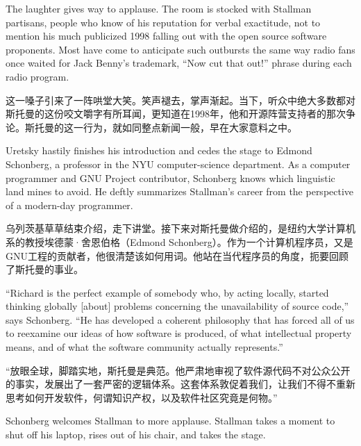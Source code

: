 \ifdefined\eng
The laughter gives way to applause. The room is stocked with Stallman partisans, people who know of his reputation for verbal exactitude, not to mention his much publicized 1998 falling out with the open source software proponents. Most have come to anticipate such outbursts the same way radio fans once waited for Jack Benny's trademark, ``Now cut that out!'' phrase during each radio program.
\fi

\ifdefined\chs
这一嗓子引来了一阵哄堂大笑。笑声褪去，掌声渐起。当下，听众中绝大多数都对斯托曼的这份咬文嚼字有所耳闻，更知道在1998年，他和开源阵营支持者的那次争论。斯托曼的这一行为，就如同整点新闻一般，早在大家意料之中。
\fi

\ifdefined\eng
Uretsky hastily finishes his introduction and cedes the stage to Edmond Schonberg, a professor in the NYU computer-science department. As a computer programmer and GNU Project contributor, Schonberg knows which linguistic land mines to avoid. He deftly summarizes Stallman's career from the perspective of a modern-day programmer.
\fi

\ifdefined\chs
乌列茨基草草结束介绍，走下讲堂。接下来对斯托曼做介绍的，是纽约大学计算机系的教授埃德蒙·舍恩伯格（Edmond Schonberg）。作为一个计算机程序员，又是GNU工程的贡献者，他很清楚该如何用词。他站在当代程序员的角度，扼要回顾了斯托曼的事业。
\fi

\ifdefined\eng
``Richard is the perfect example of somebody who, by acting locally, started thinking globally [about] problems concerning the unavailability of source code,'' says Schonberg. ``He has developed a coherent philosophy that has forced all of us to reexamine our ideas of how software is produced, of what intellectual property means, and of what the software community actually represents.''\ifdefined\vtwo{}\fi
\fi

\ifdefined\chs
``放眼全球，脚踏实地，斯托曼是典范。他严肃地审视了软件源代码不对公众公开的事实，发展出了一套严密的逻辑体系。这套体系敦促着我们，让我们不得不重新思考如何开发软件，何谓知识产权，以及软件社区究竟是何物。''\ifdefined\vtwo{}\fi
\fi

\ifdefined\eng
Schonberg welcomes Stallman to more applause. Stallman takes a moment to shut off his laptop, rises out of his chair, and takes the stage.
\fi

